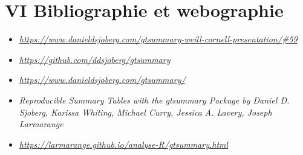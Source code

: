 \documentclass[
]{article}
\begin{document}
\newpage

\hypertarget{vi-bibliographie-et-webographie}{%
\section{VI Bibliographie et
webographie}\label{vi-bibliographie-et-webographie}}

\begin{itemize}
\item
  \emph{\url{https://www.danieldsjoberg.com/gtsummary-weill-cornell-presentation/\#59}}
\item
  \emph{\url{https://github.com/ddsjoberg/gtsummary}}
\item
  \emph{\url{https://www.danieldsjoberg.com/gtsummary/}}
\item
  \emph{Reproducible Summary Tables with the gtsummary Package by Daniel
  D. Sjoberg, Karissa Whiting, Michael Curry, Jessica A. Lavery, Joseph
  Larmarange}
\item
  \emph{\url{https://larmarange.github.io/analyse-R/gtsummary.html}}
\end{itemize}
\end{document}
